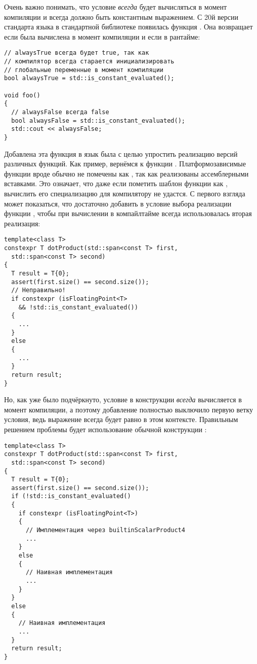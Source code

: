 Очень важно понимать, что условие \textit{всегда} будет вычисляться в момент компиляции и всегда должно быть константным выражением.
С 20й версии стандарта языка в стандартной библиотеке появилась функция .
Она возвращает  если была вычислена в момент компиляции и  если в рантайме:
\begin{verbatim}
// alwaysTrue всегда будет true, так как
// компилятор всегда старается инициализировать
// глобальные переменные в момент компиляции
bool alwaysTrue = std::is_constant_evaluated();

void foo()
{
  // alwaysFalse всегда false
  bool alwaysFalse = std::is_constant_evaluated();
  std::cout << alwaysFalse;
}
\end{verbatim}
Добавлена эта функция в язык была с целью упростить реализацию  версий различных функций.
Как пример, вернёмся к функции .
Платформозависимые функции вроде  обычно не помечены как , так как реализованы ассемблерными вставками.
Это означает, что даже если пометить шаблон функции  как , вычислить его специализацию для  компилятору не удастся.
С первого взгляда может показаться, что достаточно добавить в условие выбора реализации функции , чтобы при вычислении  в компайлтайме всегда использовалась вторая реализация:
\begin{verbatim}
template<class T>
constexpr T dotProduct(std::span<const T> first,
  std::span<const T> second)
{
  T result = T{0};
  assert(first.size() == second.size());
  // Неправильно!
  if constexpr (isFloatingPoint<T>
    && !std::is_constant_evaluated())
  {
    ...
  }
  else
  {
    ...
  }
  return result;
}
\end{verbatim}
Но, как уже было подчёркнуто, условие в конструкции  \textit{всегда} вычисляется в момент компиляции, а поэтому добавление  полностью выключило первую ветку условия, ведь выражение  всегда будет равно  в этом контексте.
Правильным решением проблемы будет использование обычной конструкции :
\begin{verbatim}
template<class T>
constexpr T dotProduct(std::span<const T> first,
  std::span<const T> second)
{
  T result = T{0};
  assert(first.size() == second.size());
  if (!std::is_constant_evaluated()
  {
    if constexpr (isFloatingPoint<T>)
    {
      // Имплементация через builtinScalarProduct4
      ...
    }
    else
    {
      // Наивная имплементация
      ...
    }
  }
  else
  {
    // Наивная имплементация
    ...
  }
  return result;
}
\end{verbatim}
